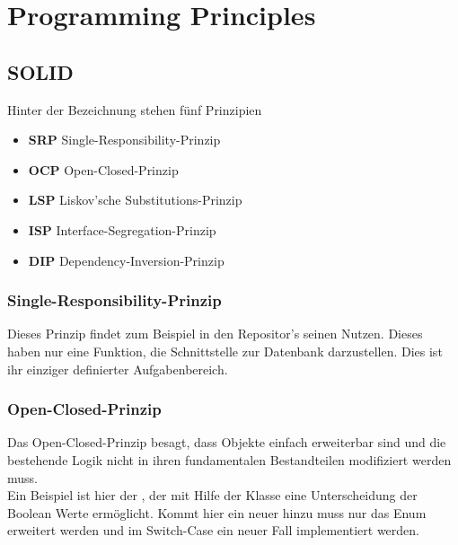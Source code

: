 
\chapter{Programming Principles}

	\section{SOLID \cite{solid.servinc}}
	Hinter der Bezeichnung  stehen fünf Prinzipien
	\begin{itemize}
		\item \textbf{SRP} Single-Responsibility-Prinzip
		\item \textbf{OCP} Open-Closed-Prinzip
		\item \textbf{LSP} Liskov’sche Substitutions-Prinzip
		\item \textbf{ISP} Interface-Segregation-Prinzip
		\item \textbf{DIP} Dependency-Inversion-Prinzip
	\end{itemize}
		\subsection{Single-Responsibility-Prinzip}
		Dieses Prinzip findet zum Beispiel in den Repositor's seinen Nutzen. Dieses haben nur eine Funktion, die Schnittstelle zur Datenbank darzustellen. Dies ist ihr einziger definierter Aufgabenbereich.
		
		\subsection{Open-Closed-Prinzip}
		Das Open-Closed-Prinzip besagt, dass Objekte einfach erweiterbar sind und die bestehende Logik nicht in ihren fundamentalen Bestandteilen modifiziert werden muss. \\
		Ein Beispiel ist hier der , der mit Hilfe der Klasse  eine Unterscheidung der  Boolean Werte ermöglicht. Kommt hier ein neuer hinzu muss nur das Enum erweitert werden und im Switch-Case ein neuer Fall implementiert werden.
		
